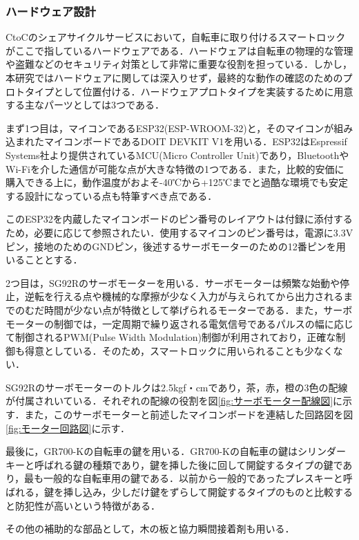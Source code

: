       \subsubsection{ハードウェア設計}
        \label{sec:ハードウェア設計}
          \par CtoCのシェアサイクルサービスにおいて，自転車に取り付けるスマートロックがここで指しているハードウェアである．ハードウェアは自転車の物理的な管理や盗難などのセキュリティ対策として非常に重要な役割を担っている．しかし，本研究ではハードウェアに関しては深入りせず，最終的な動作の確認のためのプロトタイプとして位置付ける．ハードウェアプロトタイプを実装するために用意する主なパーツとしては3つである．
          \par まず1つ目は，マイコンであるESP32(ESP-WROOM-32)と，そのマイコンが組み込まれたマイコンボードであるDOIT DEVKIT V1を用いる．ESP32はEspressif Systems社より提供されているMCU(Micro Controller Unit)であり，BluetoothやWi-Fiを介した通信が可能な点が大きな特徴の1つである．また，比較的安価に購入できる上に，動作温度がおよそ-40℃から+125℃までと過酷な環境でも安定する設計になっている点も特筆すべき点である．
          \par このESP32を内蔵したマイコンボードのピン番号のレイアウトは付録に添付するため，必要に応じて参照されたい．使用するマイコンのピン番号は，電源に3.3Vピン，接地のためのGNDピン，後述するサーボモーターのための12番ピンを用いることとする．
          \par 2つ目は，SG92Rのサーボモーターを用いる．サーボモーターは頻繁な始動や停止，逆転を行える点や機械的な摩擦が少なく入力が与えられてから出力されるまでのむだ時間が少ない点が特徴として挙げられるモーターである．また，サーボモーターの制御では，一定周期で繰り返される電気信号であるパルスの幅に応じて制御されるPWM(Pulse Width Modulation)制御が利用されており，正確な制御も得意としている．そのため，スマートロックに用いられることも少なくない．
           \par SG92Rのサーボモーターのトルクは2.5kgf・cmであり，茶，赤，橙の3色の配線が付属されいている．それぞれの配線の役割を図\ref{fig:サーボモーター配線図}に示す．また，このサーボモーターと前述したマイコンボードを連結した回路図を図\ref{fig:モーター回路図}に示す．
           \par 最後に，GR700-Kの自転車の鍵を用いる．GR700-Kの自転車の鍵はシリンダーキーと呼ばれる鍵の種類であり，鍵を挿した後に回して開錠するタイプの鍵であり，最も一般的な自転車用の鍵である．以前から一般的であったプレスキーと呼ばれる，鍵を挿し込み，少しだけ鍵をずらして開錠するタイプのものと比較すると防犯性が高いという特徴がある．
           \par その他の補助的な部品として，木の板と協力瞬間接着剤も用いる．
